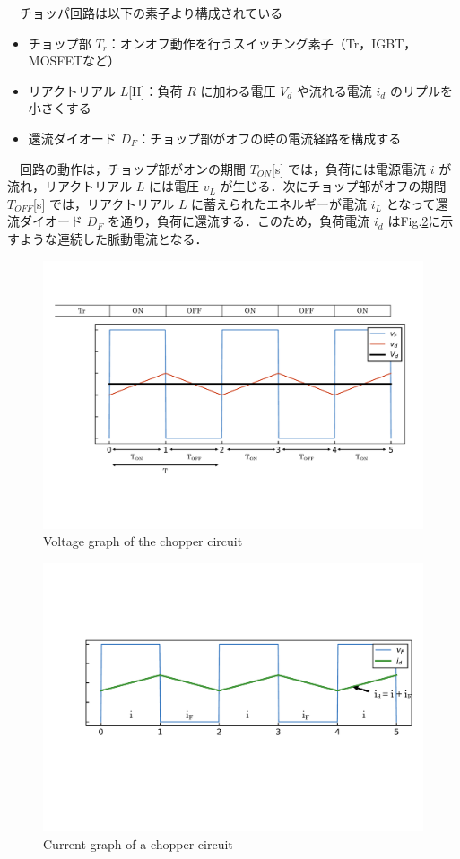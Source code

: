 　チョッパ回路は以下の素子より構成されている
\begin{itemize}
    \item チョップ部 $T_r$：オンオフ動作を行うスイッチング素子（Tr，IGBT，MOSFETなど）
    \item リアクトリアル $L$[H]：負荷 $R$ に加わる電圧 $V_d$ や流れる電流 $i_d$ のリプルを小さくする
    \item 還流ダイオード $D_F$：チョップ部がオフの時の電流経路を構成する
\end{itemize}
　回路の動作は，チョップ部がオンの期間 $T_{ON}$[s] では，負荷には電源電流 $i$ が流れ，リアクトリアル $L$ には電圧 $v_L$ が生じる．次にチョップ部がオフの期間 $T_{OFF}$[s] では，リアクトリアル $L$ に蓄えられたエネルギーが電流 $i_L$ となって還流ダイオード $D_F$ を通り，負荷に還流する．このため，負荷電流 $i_d$ はFig.\ref{fig:chopper_current_graph}に示すような連続した脈動電流となる．\\

\begin{figure}[H]
    \centering
    \includegraphics[width=12cm]{./fig/chopper_graph.pdf}
    \caption{Voltage graph of the chopper circuit}
    \label{fig:chopper_graph}
\end{figure}

\begin{figure}[H]
    \centering
    \includegraphics[width=12cm]{./fig/chopper_current_graph.pdf}
    \caption{Current graph of a chopper circuit}
    \label{fig:chopper_current_graph}
\end{figure}

